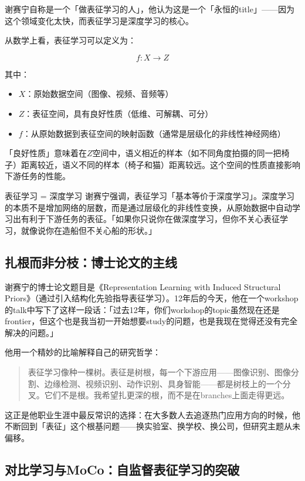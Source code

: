 \documentclass[a4paper]{article}
\begin{document}
谢赛宁自称是一个「做表征学习的人」，他认为这是一个「永恒的title」——因为这个领域变化太快，而表征学习是深度学习的核心。

从数学上看，表征学习可以定义为：

$$f: X \rightarrow Z$$

其中：
\begin{itemize}
\item $X$：原始数据空间（图像、视频、音频等）
\item $Z$：表征空间，具有良好性质（低维、可解耦、可分）
\item $f$：从原始数据到表征空间的映射函数（通常是层级化的非线性神经网络）
\end{itemize}

「良好性质」意味着在$Z$空间中，语义相近的样本（如不同角度拍摄的同一把椅子）距离较近，语义不同的样本（椅子和猫）距离较远。这个空间的性质直接影响下游任务的性能。

\begin{importantbox}{表征学习 = 深度学习}
谢赛宁强调，表征学习「基本等价于深度学习」。深度学习的本质不是增加网络的层数，而是通过层级化的非线性变换，从原始数据中自动学习出有利于下游任务的表征。「如果你只说你在做深度学习，但你不关心表征学习，就像说你在造船但不关心船的形状。」
\end{importantbox}

\subsection{扎根而非分枝：博士论文的主线}

谢赛宁的博士论文题目是《Representation Learning with Induced Structural Priors》（通过引入结构化先验指导表征学习）。12年后的今天，他在一个workshop的talk中写下了这样一段话：「过去12年，你们workshop的topic虽然现在还是frontier，但这个也是我当初一开始想要study的问题，也是我现在觉得还没有完全解决的问题。」

他用一个精妙的比喻解释自己的研究哲学：

\begin{quote}
表征学习像种一棵树。表征是树根，每一个下游应用——图像识别、图像分割、边缘检测、视频识别、动作识别、具身智能——都是树枝上的一个分叉。它们不是根。我希望扎更深的根，而不是在branches上面走得更远。
\end{quote}

这正是他职业生涯中最反常识的选择：在大多数人去追逐热门应用方向的时候，他不断回到「表征」这个根基问题——换实验室、换学校、换公司，但研究主题从未偏移。

\subsection{对比学习与MoCo：自监督表征学习的突破}
\end{document}
